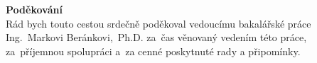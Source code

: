 \newpage
\pagestyle{empty}

\noindent
{\large\bfseries Poděkování}\\

\noindent
Rád bych touto cestou srdečně poděkoval vedoucímu bakalářské práce Ing.~Markovi Beránkovi,~Ph.D. za~čas věnovaný vedením této práce, za~příjemnou spolupráci a~za cenné poskytnuté rady a připomínky.
